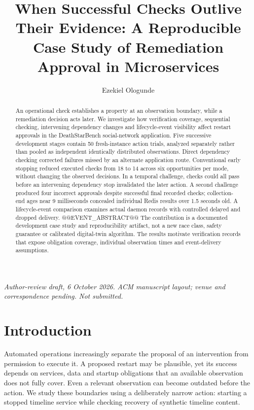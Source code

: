 \documentclass[manuscript,review,nonacm]{acmart}
\title{When Successful Checks Outlive Their Evidence: A Reproducible Case Study of Remediation Approval in Microservices}
\author{Ezekiel Ologunde}
\affiliation{\institution{Independent Researcher}}
\begin{document}
\begin{abstract}
An operational check establishes a property at an observation boundary, while a remediation decision acts later. We investigate how verification coverage, sequential checking, intervening dependency changes and lifecycle-event visibility affect restart approvals in the DeathStarBench social-network application. Five successive development stages contain 50 fresh-instance action trials, analyzed separately rather than pooled as independent identically distributed observations. Direct dependency checking corrected failures missed by an alternate application route. Conventional early stopping reduced executed checks from 18 to 14 across six opportunities per mode, without changing the observed decisions. In a temporal challenge, checks could all pass before an intervening dependency stop invalidated the later action. A second challenge produced four incorrect approvals despite successful final recorded checks; collection-end ages near 9 milliseconds concealed individual Redis results over 1.5 seconds old. A lifecycle-event comparison examines actual daemon records with controlled delayed and dropped delivery. @@EVENT_ABSTRACT@@ The contribution is a documented development case study and reproducibility artifact, not a new race class, safety guarantee or calibrated digital-twin algorithm. The results motivate verification records that expose obligation coverage, individual observation times and event-delivery assumptions.
\end{abstract}
\maketitle
\noindent\textit{Author-review draft, 6 October 2026. ACM manuscript layout; venue and correspondence pending. Not submitted.}

\section{Introduction}
Automated operations increasingly separate the proposal of an intervention from permission to execute it. A proposed restart may be plausible, yet its success depends on services, data and startup obligations that an available observation does not fully cover. Even a relevant observation can become outdated before the action. We study these boundaries using a deliberately narrow action: starting a stopped timeline service while checking recovery of synthetic timeline content.
\end{document}
